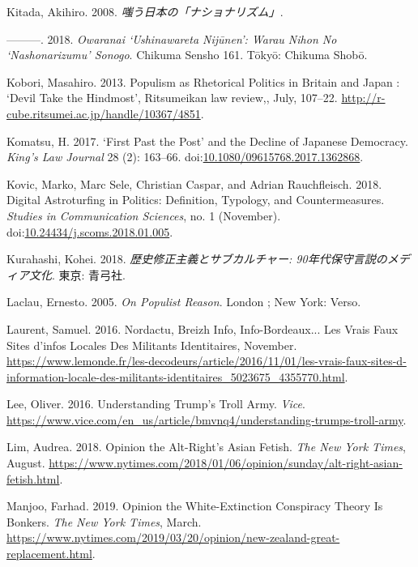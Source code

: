 \documentclass[10pt,british,A4paper,,openany]{memoir}
\begin{document}
\hypertarget{ref-kitada__2008}{}
Kitada, Akihiro. 2008. \emph{嗤う日本の「ナショナリズム」}.

\hypertarget{ref-kitada_owaranai_2018}{}
---------. 2018. \emph{Owaranai `Ushinawareta Nijūnen': Warau Nihon No
`Nashonarizumu' Sonogo}. Chikuma Sensho 161. Tōkyō: Chikuma Shobō.

\hypertarget{ref-kobori_populism_2013}{}
Kobori, Masahiro. 2013. Populism as Rhetorical Politics in Britain and
Japan : `Devil Take the Hindmost', Ritsumeikan law review,, July,
107--22. \url{http://r-cube.ritsumei.ac.jp/handle/10367/4851}.

\hypertarget{ref-komatsu_first_2017}{}
Komatsu, H. 2017. `First Past the Post' and the Decline of Japanese
Democracy. \emph{King's Law Journal} 28 (2): 163--66.
doi:\href{https://doi.org/10.1080/09615768.2017.1362868}{10.1080/09615768.2017.1362868}.

\hypertarget{ref-kovic_digital_2018}{}
Kovic, Marko, Marc Sele, Christian Caspar, and Adrian Rauchfleisch.
2018. Digital Astroturfing in Politics: Definition, Typology, and
Countermeasures. \emph{Studies in Communication Sciences}, no. 1
(November).
doi:\href{https://doi.org/10.24434/j.scoms.2018.01.005}{10.24434/j.scoms.2018.01.005}.

\hypertarget{ref-kurahashi_:_2018}{}
Kurahashi, Kohei. 2018. \emph{歴史修正主義とサブカルチャー:
90年代保守言説のメディア文化}. 東京: 青弓社.

\hypertarget{ref-laclau_populist_2005}{}
Laclau, Ernesto. 2005. \emph{On Populist Reason}. London ; New York:
Verso.

\hypertarget{ref-laurent_nordactu_2016}{}
Laurent, Samuel. 2016. Nordactu, Breizh Info, Info-Bordeaux... Les Vrais
Faux Sites d'infos Locales Des Militants Identitaires, November.
\url{https://www.lemonde.fr/les-decodeurs/article/2016/11/01/les-vrais-faux-sites-d-information-locale-des-militants-identitaires_5023675_4355770.html}.

\hypertarget{ref-lee_understanding_2016}{}
Lee, Oliver. 2016. Understanding Trump's Troll Army. \emph{Vice}.
\url{https://www.vice.com/en_us/article/bmvnq4/understanding-trumps-troll-army}.

\hypertarget{ref-lim_opinion_2018}{}
Lim, Audrea. 2018. Opinion the Alt-Right's Asian Fetish. \emph{The New
York Times}, August.
\url{https://www.nytimes.com/2018/01/06/opinion/sunday/alt-right-asian-fetish.html}.

\hypertarget{ref-manjoo_opinion_2019}{}
Manjoo, Farhad. 2019. Opinion the White-Extinction Conspiracy Theory Is
Bonkers. \emph{The New York Times}, March.
\url{https://www.nytimes.com/2019/03/20/opinion/new-zealand-great-replacement.html}.
\end{document}
